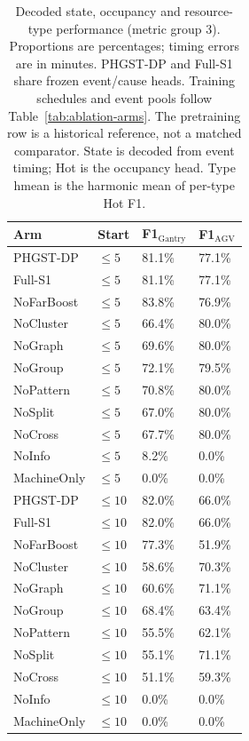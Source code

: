 \begin{table}[p]
\centering
\scriptsize
\setlength{\tabcolsep}{3pt}
\renewcommand{\arraystretch}{1.12}
\caption{Decoded state, occupancy and resource-type performance (metric group 3). Proportions are percentages; timing errors are in minutes. PHGST-DP and Full-S1 share frozen event/cause heads. Training schedules and event pools follow Table~\ref{tab:ablation-arms}. The pretraining row is a historical reference, not a matched comparator. State is decoded from event timing; Hot is the occupancy head. Type hmean is the harmonic mean of per-type Hot F1.}
\label{tab:complete-3-3}
\begin{tabularx}{\textwidth}{@{}lXXX@{}}
\toprule
Arm & Start & F1$_{\mathrm{Gantry}}$ & F1$_{\mathrm{AGV}}$ \\
\midrule
PHGST-DP & $\le 5$ & 81.1\% & 77.1\% \\
Full-S1 & $\le 5$ & 81.1\% & 77.1\% \\
NoFarBoost & $\le 5$ & 83.8\% & 76.9\% \\
NoCluster & $\le 5$ & 66.4\% & 80.0\% \\
NoGraph & $\le 5$ & 69.6\% & 80.0\% \\
NoGroup & $\le 5$ & 72.1\% & 79.5\% \\
NoPattern & $\le 5$ & 70.8\% & 80.0\% \\
NoSplit & $\le 5$ & 67.0\% & 80.0\% \\
NoCross & $\le 5$ & 67.7\% & 80.0\% \\
NoInfo & $\le 5$ & 8.2\% & 0.0\% \\
MachineOnly & $\le 5$ & 0.0\% & 0.0\% \\
\midrule
PHGST-DP & $\le 10$ & 82.0\% & 66.0\% \\
Full-S1 & $\le 10$ & 82.0\% & 66.0\% \\
NoFarBoost & $\le 10$ & 77.3\% & 51.9\% \\
NoCluster & $\le 10$ & 58.6\% & 70.3\% \\
NoGraph & $\le 10$ & 60.6\% & 71.1\% \\
NoGroup & $\le 10$ & 68.4\% & 63.4\% \\
NoPattern & $\le 10$ & 55.5\% & 62.1\% \\
NoSplit & $\le 10$ & 55.1\% & 71.1\% \\
NoCross & $\le 10$ & 51.1\% & 59.3\% \\
NoInfo & $\le 10$ & 0.0\% & 0.0\% \\
MachineOnly & $\le 10$ & 0.0\% & 0.0\% \\
\midrule

\end{tabularx}
\end{table}
